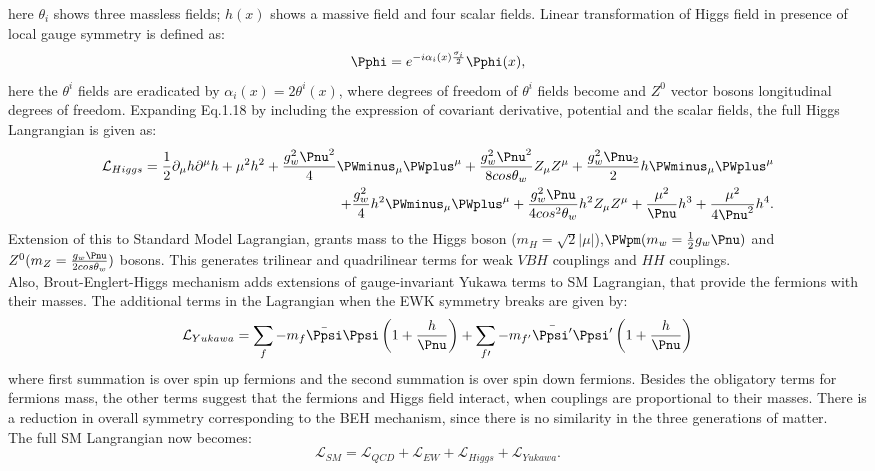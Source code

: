 here $\theta_i$ shows three massless fields; $h(x)$ shows a massive field and four scalar fields. Linear transformation of Higgs field in presence of local gauge symmetry is defined as:
\begin{equation}
    \Pphi= e^{-i\alpha_i(x)\frac{\sigma_i}{2}}\Pphi(x),
\end{equation}
here the $\theta^i$ fields are eradicated by $\alpha_i(x)=2\theta^i(x)$, where degrees of freedom of $\theta^i$ fields become \PWpm and $Z^0$ vector bosons longitudinal degrees of freedom.
Expanding Eq.1.18 by including the expression of covariant derivative, potential and the scalar fields, the full Higgs Langrangian is given as:
\begin{equation}
\begin{aligned}
    \mathcal{L}_{Higgs}=\frac{1}{2}\partial_\mu h \partial^\mu h +\mu^2 h^2 + \frac{g_w^2 \Pnu^2}{4} \PWminus_\mu \PWplus^\mu + \frac{g_w ^2 \Pnu^2}{8 cos \theta_w }Z_\mu Z^\mu +\frac{g_w^2 \Pnu_2}{2}h\PWminus_\mu \PWplus^\mu\\
    + \frac{g_w^2}{4}h^2 \PWminus_\mu \PWplus^\mu + \frac{g_w^2 \Pnu}{4cos^2 \theta_w}h^2 Z_\mu Z^\mu + \frac{\mu^2}{\Pnu} h^3 + \frac{\mu^2}{4\Pnu^2}h^4.
\end{aligned}
\end{equation}
Extension of this to Standard Model Lagrangian, grants mass to the Higgs boson ($m_H = \sqrt{2}|\mu|$),$\PWpm  (m_w= \frac{1}{2}g_w \Pnu)$ and $Z^0 (m_Z = \frac{g_w \Pnu}{2 cos \theta_w})$ bosons. This generates trilinear and quadrilinear terms for weak $VBH$ couplings and $HH$ couplings.\\
Also, Brout-Englert-Higgs mechanism adds extensions of gauge-invariant Yukawa terms to SM Lagrangian, that provide the fermions with their masses. The additional terms in the Lagrangian when the EWK symmetry breaks are given by:
\begin{equation}
    \mathcal{L}_{Yukawa}=\sum_f -m_f \bar{\Ppsi}\Ppsi \left(1+\frac{h}{\Pnu}\right) + \sum_{f\prime}  -m_{f^\prime} \bar{\Ppsi^\prime}\Ppsi^\prime \left(1+\frac{h}{\Pnu} \right)
\end{equation}
where first summation is over spin up fermions and the second summation is over spin down fermions. Besides the obligatory terms for fermions mass, the other terms suggest that the fermions and Higgs field interact, when couplings are proportional to their masses. There is a reduction in overall symmetry corresponding to the BEH mechanism, since there is no similarity in the three generations of matter.\\
The full SM Langrangian now becomes:
\begin{equation}
    \mathcal{L}_{SM}= \mathcal{L}_{QCD}+ \mathcal{L}_{EW}+ \mathcal{L}_{Higgs}+ \mathcal{L}_{Yukawa}.
\end{equation}

